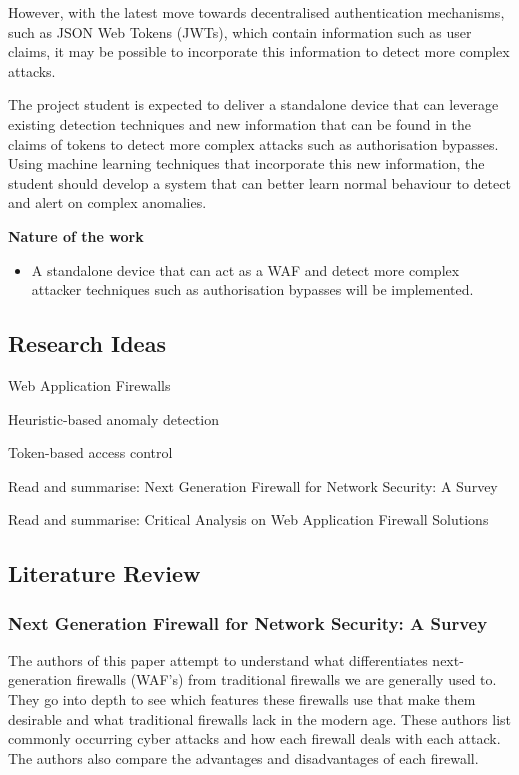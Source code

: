 However, with the latest move towards decentralised authentication mechanisms, such as JSON Web Tokens (JWTs), which contain information such as user claims, it may be possible to incorporate this information to detect more complex attacks.

The project student is expected to deliver a standalone device that can leverage existing detection techniques and new information that can be found in the claims of tokens to detect more complex attacks such as authorisation bypasses. Using machine learning techniques that incorporate this new information, the student should develop a system that can better learn normal behaviour to detect and alert on complex anomalies.

\textbf{Nature of the work}
\begin{itemize}
    \item A standalone device that can act as a WAF and detect more complex attacker techniques such as authorisation bypasses will be implemented.
\end{itemize}

\subsection{Research Ideas}
\begin{compactitem}
\item Web Application Firewalls
\item Heuristic-based anomaly detection
\item Token-based access control
\item Read and summarise: Next Generation Firewall for Network Security: A Survey \cite{8478973}
\item Read and summarise: Critical Analysis on Web Application Firewall Solutions \cite{6513431} 
\end{compactitem}


\subsection{Literature Review}
\subsubsection{Next Generation Firewall for Network Security: A Survey \cite{8478973}}
    The authors of this paper attempt to understand what differentiates next-generation firewalls (WAF's) from traditional firewalls we are generally used to. They go into depth to see which features these firewalls use that make them desirable and what traditional firewalls lack in the modern age. These authors list commonly occurring cyber attacks and how each firewall deals with each attack. The authors also compare the advantages and disadvantages of each firewall.
    
